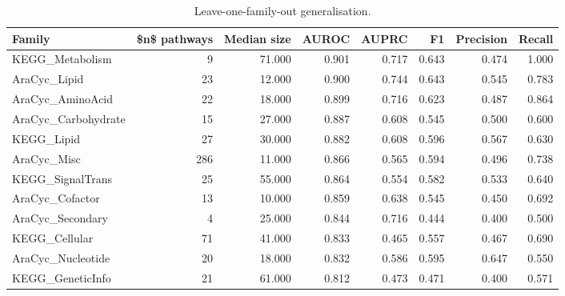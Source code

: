 \begin{table}[htbp]
\centering
\caption{Leave-one-family-out generalisation.}
\label{tab:lofo_recomputed}
\begin{tabular}{lrrrrrrr}
\toprule
Family & \$n\$ pathways & Median size & AUROC & AUPRC & F1 & Precision & Recall \\
\midrule
KEGG\_Metabolism & 9 & 71.000 & 0.901 & 0.717 & 0.643 & 0.474 & 1.000 \\
AraCyc\_Lipid & 23 & 12.000 & 0.900 & 0.744 & 0.643 & 0.545 & 0.783 \\
AraCyc\_AminoAcid & 22 & 18.000 & 0.899 & 0.716 & 0.623 & 0.487 & 0.864 \\
AraCyc\_Carbohydrate & 15 & 27.000 & 0.887 & 0.608 & 0.545 & 0.500 & 0.600 \\
KEGG\_Lipid & 27 & 30.000 & 0.882 & 0.608 & 0.596 & 0.567 & 0.630 \\
AraCyc\_Misc & 286 & 11.000 & 0.866 & 0.565 & 0.594 & 0.496 & 0.738 \\
KEGG\_SignalTrans & 25 & 55.000 & 0.864 & 0.554 & 0.582 & 0.533 & 0.640 \\
AraCyc\_Cofactor & 13 & 10.000 & 0.859 & 0.638 & 0.545 & 0.450 & 0.692 \\
AraCyc\_Secondary & 4 & 25.000 & 0.844 & 0.716 & 0.444 & 0.400 & 0.500 \\
KEGG\_Cellular & 71 & 41.000 & 0.833 & 0.465 & 0.557 & 0.467 & 0.690 \\
AraCyc\_Nucleotide & 20 & 18.000 & 0.832 & 0.586 & 0.595 & 0.647 & 0.550 \\
KEGG\_GeneticInfo & 21 & 61.000 & 0.812 & 0.473 & 0.471 & 0.400 & 0.571 \\
\bottomrule
\end{tabular}

\end{table}
